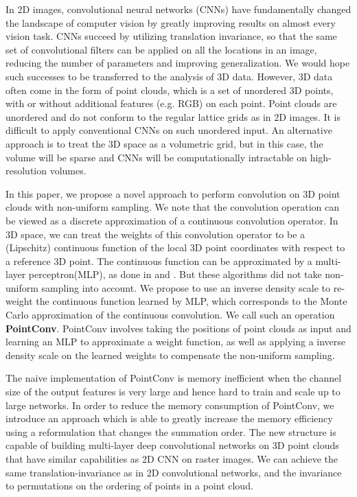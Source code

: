 \documentclass[10pt,twocolumn,letterpaper]{article}
\begin{document}
In 2D images, convolutional neural networks (CNNs) have fundamentally changed the landscape of computer vision by greatly improving results on almost every vision task. CNNs succeed by utilizing translation invariance, so that the same set of convolutional filters can be applied on all the locations in an image, reducing the number of parameters and improving generalization. We would hope such successes to be transferred to the analysis of 3D data. However, 3D data often come in the form of point clouds, which is a set of unordered 3D points, with or without additional features (e.g. RGB) on each point. Point clouds are unordered and do not conform to the regular lattice grids as in 2D images. It is difficult to apply conventional CNNs on such unordered input. An alternative approach is to treat the 3D space as a volumetric grid, but in this case, the volume will be sparse and CNNs will be computationally intractable on high-resolution volumes.



In this paper, we propose a novel approach to perform convolution on 3D point clouds with non-uniform sampling. We note that the convolution operation can be viewed as a discrete approximation of a continuous convolution operator. In 3D space, we can treat the weights of this convolution operator to be a (Lipschitz) continuous function of the local 3D point coordinates with respect to a reference 3D point. The continuous function can be approximated by a multi-layer perceptron(MLP), as done in  \cite{simonovsky2017dynamic} and \cite{jia2016dynamic}. But these algorithms did not take non-uniform sampling into account. 
We propose to use an inverse density scale to re-weight the continuous function learned by MLP, which corresponds to the Monte Carlo approximation of the continuous convolution. We call such an operation \textbf{PointConv}. PointConv involves taking the positions of point clouds as input and learning an MLP to approximate a weight function, as well as applying a inverse density scale on the learned weights to compensate the non-uniform sampling.

The naive implementation of PointConv is memory inefficient when the channel size of the output features is very large and hence hard to train and scale up to large networks. In order to reduce the memory consumption of PointConv, we introduce an approach which is able to greatly increase the memory efficiency using a reformulation that changes the summation order. The new structure is capable of building multi-layer deep convolutional networks on 3D point clouds that have similar capabilities as 2D CNN on raster images. We can achieve the same translation-invariance as in 2D convolutional networks, and the invariance to permutations on the ordering of points in a point cloud. 
\end{document}
